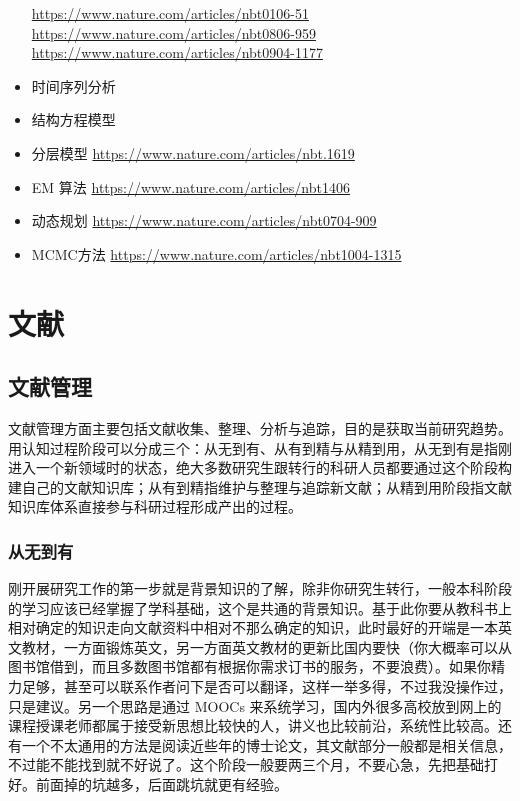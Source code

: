 \documentclass[]{book}
\begin{document}
\begin{itemize}
  \url{https://www.nature.com/articles/nbt0106-51}
  \url{https://www.nature.com/articles/nbt0806-959}
  \url{https://www.nature.com/articles/nbt0904-1177}
\item
  时间序列分析
\item
  结构方程模型
\item
  分层模型 \url{https://www.nature.com/articles/nbt.1619}
\item
  EM 算法 \url{https://www.nature.com/articles/nbt1406}
\item
  动态规划 \url{https://www.nature.com/articles/nbt0704-909}
\item
  MCMC方法 \url{https://www.nature.com/articles/nbt1004-1315}
\end{itemize}

\chapter{文献}

\section{文献管理}

文献管理方面主要包括文献收集、整理、分析与追踪，目的是获取当前研究趋势。用认知过程阶段可以分成三个：从无到有、从有到精与从精到用，从无到有是指刚进入一个新领域时的状态，绝大多数研究生跟转行的科研人员都要通过这个阶段构建自己的文献知识库；从有到精指维护与整理与追踪新文献；从精到用阶段指文献知识库体系直接参与科研过程形成产出的过程。

\subsection{从无到有}

刚开展研究工作的第一步就是背景知识的了解，除非你研究生转行，一般本科阶段的学习应该已经掌握了学科基础，这个是共通的背景知识。基于此你要从教科书上相对确定的知识走向文献资料中相对不那么确定的知识，此时最好的开端是一本英文教材，一方面锻炼英文，另一方面英文教材的更新比国内要快（你大概率可以从图书馆借到，而且多数图书馆都有根据你需求订书的服务，不要浪费）。如果你精力足够，甚至可以联系作者问下是否可以翻译，这样一举多得，不过我没操作过，只是建议。另一个思路是通过
MOOCs
来系统学习，国内外很多高校放到网上的课程授课老师都属于接受新思想比较快的人，讲义也比较前沿，系统性比较高。还有一个不太通用的方法是阅读近些年的博士论文，其文献部分一般都是相关信息，不过能不能找到就不好说了。这个阶段一般要两三个月，不要心急，先把基础打好。前面掉的坑越多，后面跳坑就更有经验。
\end{document}

